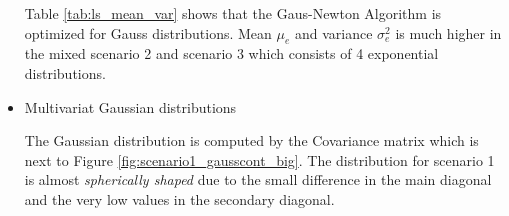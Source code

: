 \documentclass{article}
\begin{document}
\begin{itemize}
    Table \ref{tab:ls_mean_var} shows that the Gaus-Newton Algorithm is optimized for Gauss distributions. Mean $\mu_{e}$ and variance $\sigma^2_{e}$ is much higher in the mixed scenario 2 and scenario 3 which consists of 4 exponential distributions.
        
    \newpage
    
    \item Multivariat Gaussian distributions\\
      
        
        
  
        \begin{figure}[hbt!]
        \begin{floatrow}
		\label{tab:scenario1_covariance}
		\end{floatrow}
		\end{figure}
		
		The Gaussian distribution is computed by the Covariance matrix which is next to Figure \ref{fig:scenario1_gausscont_big}. The distribution for scenario 1 is almost \textit{spherically shaped} due to the small difference in the main diagonal and the very low values in the secondary diagonal. 
		

\end{itemize}
\end{document}
